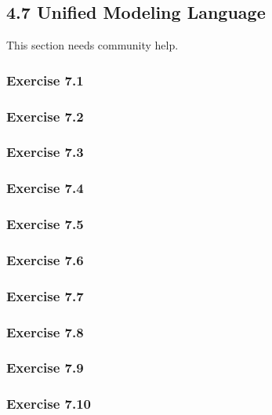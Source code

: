 \documentclass[../../main.tex]{subfiles}
\begin{document}
\subsection{4.7 Unified Modeling Language}

This section needs community help.

\subsubsection*{Exercise 7.1}

\subsubsection*{Exercise 7.2}

\subsubsection*{Exercise 7.3}

\subsubsection*{Exercise 7.4}

\subsubsection*{Exercise 7.5}

\subsubsection*{Exercise 7.6}

\subsubsection*{Exercise 7.7}

\subsubsection*{Exercise 7.8}

\subsubsection*{Exercise 7.9}

\subsubsection*{Exercise 7.10}
\end{document}
